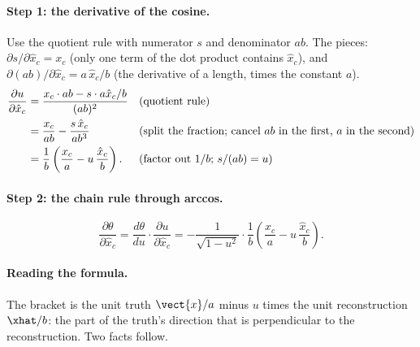 \paragraph{Step 1: the derivative of the cosine.} Use the quotient rule with numerator $s$ and
denominator $ab$. The pieces: $\partial s/\partial\hat{x}_c = x_c$ (only one term of the dot
product contains $\hat{x}_c$), and $\partial(ab)/\partial \hat{x}_c = a\,\hat{x}_c/b$ (the
derivative of a length, times the constant $a$).
\begin{align}
\frac{\partial u}{\partial \hat{x}_c}
&= \frac{x_c \cdot ab - s \cdot a\hat{x}_c/b}{(ab)^2}
  && \text{(quotient rule)} \notag\\
&= \frac{x_c}{ab} - \frac{s\,\hat{x}_c}{a b^3}
  && \text{(split the fraction; cancel $ab$ in the first, $a$ in the second)} \notag\\
&= \frac{1}{b}\left(\frac{x_c}{a} - u\,\frac{\hat{x}_c}{b}\right).
  && \text{(factor out $1/b$; $s/(ab) = u$)}\label{eq:losses:du}
\end{align}

\paragraph{Step 2: the chain rule through arccos.}
\begin{equation}\label{eq:losses:dtheta}
\frac{\partial\theta}{\partial \hat{x}_c} = \frac{d\theta}{du}\cdot\frac{\partial u}{\partial \hat{x}_c}
= -\frac{1}{\sqrt{1 - u^2}}\cdot\frac{1}{b}\left(\frac{x_c}{a} - u\,\frac{\hat{x}_c}{b}\right).
\end{equation}

\paragraph{Reading the formula.} The bracket is the unit truth $\vect{x}/a$ minus $u$ times the
unit reconstruction $\xhat/b$: the part of the truth's direction that is perpendicular to the
reconstruction. Two facts follow.


